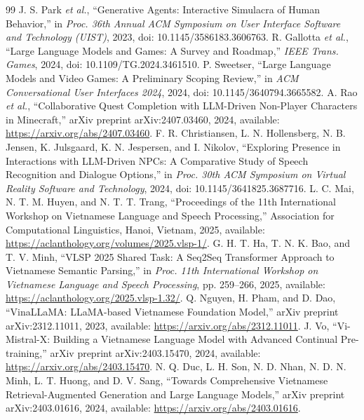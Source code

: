 ﻿\documentclass[a4paper,12pt]{article}
\begin{document}
\begin{thebibliography}{99}
 J. S. Park \emph{et al.}, ``Generative Agents: Interactive Simulacra of Human Behavior,'' in \emph{Proc. 36th Annual ACM Symposium on User Interface Software and Technology (UIST)}, 2023, doi: 10.1145/3586183.3606763.
 R. Gallotta \emph{et al.}, ``Large Language Models and Games: A Survey and Roadmap,'' \emph{IEEE Trans. Games}, 2024, doi: 10.1109/TG.2024.3461510.
 P. Sweetser, ``Large Language Models and Video Games: A Preliminary Scoping Review,'' in \emph{ACM Conversational User Interfaces 2024}, 2024, doi: 10.1145/3640794.3665582.
 A. Rao \emph{et al.}, ``Collaborative Quest Completion with LLM-Driven Non-Player Characters in Minecraft,'' arXiv preprint arXiv:2407.03460, 2024, available: \url{https://arxiv.org/abs/2407.03460}.
 F. R. Christiansen, L. N. Hollensberg, N. B. Jensen, K. Julsgaard, K. N. Jespersen, and I. Nikolov, ``Exploring Presence in Interactions with LLM-Driven NPCs: A Comparative Study of Speech Recognition and Dialogue Options,'' in \emph{Proc. 30th ACM Symposium on Virtual Reality Software and Technology}, 2024, doi: 10.1145/3641825.3687716.
 L. C. Mai, N. T. M. Huyen, and N. T. T. Trang, ``Proceedings of the 11th International Workshop on Vietnamese Language and Speech Processing,'' Association for Computational Linguistics, Hanoi, Vietnam, 2025, available: \url{https://aclanthology.org/volumes/2025.vlsp-1/}.
 G. H. T. Ha, T. N. K. Bao, and T. V. Minh, ``VLSP 2025 Shared Task: A Seq2Seq Transformer Approach to Vietnamese Semantic Parsing,'' in \emph{Proc. 11th International Workshop on Vietnamese Language and Speech Processing}, pp. 259--266, 2025, available: \url{https://aclanthology.org/2025.vlsp-1.32/}.
 Q. Nguyen, H. Pham, and D. Dao, ``VinaLLaMA: LLaMA-based Vietnamese Foundation Model,'' arXiv preprint arXiv:2312.11011, 2023, available: \url{https://arxiv.org/abs/2312.11011}.
 J. Vo, ``Vi-Mistral-X: Building a Vietnamese Language Model with Advanced Continual Pre-training,'' arXiv preprint arXiv:2403.15470, 2024, available: \url{https://arxiv.org/abs/2403.15470}.
 N. Q. Duc, L. H. Son, N. D. Nhan, N. D. N. Minh, L. T. Huong, and D. V. Sang, ``Towards Comprehensive Vietnamese Retrieval-Augmented Generation and Large Language Models,'' arXiv preprint arXiv:2403.01616, 2024, available: \url{https://arxiv.org/abs/2403.01616}.

\end{thebibliography}
\end{document}
